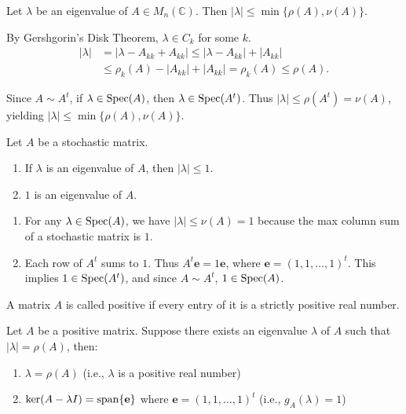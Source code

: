 \begin{theorem}
Let $\lambda$ be an eigenvalue of $A\in M_n(\mathbb{C})$. Then $|\lambda|\le \min\{\rho(A),\nu(A)\}$.
\end{theorem}

\begin{pfbox}
By Gershgorin's Disk Theorem, $\lambda\in C_k$ for some $k$.
\begin{align*}
|\lambda|
&=
|\lambda-A_{kk}+A_{kk}|
\le
|\lambda-A_{kk}|+|A_{kk}|\\
&\le
\rho_k(A)-|A_{kk}|+|A_{kk}|
=
\rho_k(A)
\le
\rho(A).    
\end{align*}

Since $A\sim A^t$, if $\lambda\in\operatorname{Spec}(A)$, then $\lambda\in\operatorname{Spec}(A^t)$.
Thus $|\lambda|\le \rho(A^t)=\nu(A)$, yielding $|\lambda|\le \min\{\rho(A),\nu(A)\}$.
\end{pfbox}

\begin{theorem}
Let $A$ be a stochastic matrix.
\begin{enumerate}
    \item If $\lambda$ is an eigenvalue of $A$, then $|\lambda|\le 1$.
    \item $1$ is an eigenvalue of $A$.
\end{enumerate}
\end{theorem}

\begin{pfbox}
\begin{enumerate}
    \item For any $\lambda\in\operatorname{Spec}(A)$, we have $|\lambda|\le \nu(A)=1$ because the max column sum of a stochastic matrix is $1$.

    \item Each row of $A^t$ sums to $1$. Thus $A^t\mathbf{e}=1\mathbf{e}$, where $\mathbf{e}=(1,1,\dots,1)^t$. This implies $1\in\operatorname{Spec}(A^t)$, and since $A\sim A^t$, $1\in\operatorname{Spec}(A)$.
\end{enumerate}
\end{pfbox}


\begin{definition}
A matrix $A$ is called positive if every entry of it is a strictly positive real number.
\end{definition}

\begin{theorem}
Let $A$ be a positive matrix. Suppose there exists an eigenvalue $\lambda$ of $A$ such that $|\lambda|=\rho(A)$, then:
\begin{enumerate}
    \item $\lambda=\rho(A)$ (i.e., $\lambda$ is a positive real number)
    \item $\ker(A-\lambda I)=\operatorname{span}\{\mathbf{e}\}$ where $\mathbf{e}=(1,1,\dots,1)^t$ (i.e., $g_A(\lambda)=1$)
\end{enumerate}
\end{theorem}

